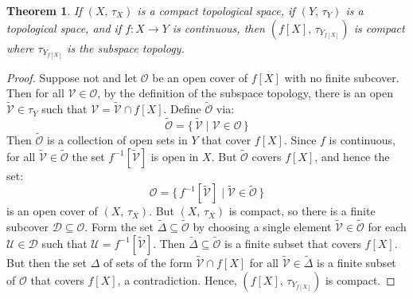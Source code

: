 \documentclass{article}
\theoremstyle{plain}
\newtheorem{theorem}{Theorem}[section]
\theoremstyle{normal}
\begin{document}
        \begin{theorem}
            If $(X,\,\tau_{X})$ is a compact topological space, if
            $(Y,\,\tau_{Y})$ is a topological space, and if
            $f:X\rightarrow{Y}$ is continuous, then
            $(f[X],\,\tau_{Y_{f[X]}})$ is compact where
            $\tau_{Y_{f[X]}}$ is the subspace topology.
        \end{theorem}
        \begin{proof}
            Suppose not and let $\mathcal{O}$ be an open cover of $f[X]$ with
            no finite subcover. Then for all
            $\mathcal{V}\in\mathcal{O}$, by the definition of the subspace
            topology, there is an open $\tilde{\mathcal{V}}\in\tau_{Y}$ such
            that $\mathcal{V}=\tilde{\mathcal{V}}\cap{f}[X]$.
            Define $\tilde{\mathcal{O}}$ via:
            \begin{equation}
                \tilde{\mathcal{O}}
                =\{\,\tilde{\mathcal{V}}\;|\;\mathcal{V}\in\mathcal{O}\,\}
            \end{equation}
            Then $\tilde{\mathcal{O}}$ is a collection of open sets in $Y$ that
            cover $f[X]$. Since $f$ is continuous, for all
            $\tilde{\mathcal{V}}\in\tilde{\mathcal{O}}$ the set
            $f^{-1}[\tilde{\mathcal{V}}]$ is open in $X$. But
            $\tilde{\mathcal{O}}$ covers $f[X]$, and hence the set:
            \begin{equation}
                \mathscr{O}
                =\{\,f^{-1}[\tilde{\mathcal{V}}]\;|\;
                    \tilde{\mathcal{V}}\in\tilde{\mathcal{O}}\,\}
            \end{equation}
            is an open cover of $(X,\,\tau_{X})$. But $(X,\,\tau_{X})$ is
            compact, so there is a finite subcover
            $\mathscr{D}\subseteq\mathscr{O}$. Form the set
            $\tilde{\Delta}\subseteq\tilde{\mathcal{O}}$ by choosing a single
            element $\tilde{\mathcal{V}}\in\tilde{\mathcal{O}}$ for each
            $\mathcal{U}\in\mathscr{D}$ such that
            $\mathcal{U}=f^{-1}[\tilde{\mathcal{V}}]$. Then
            $\tilde{\Delta}\subseteq\tilde{\mathcal{O}}$ is a finite subset that
            covers $f[X]$. But then the set $\Delta$ of sets of the form
            $\tilde{\mathcal{V}}\cap{f}[X]$ for all
            $\tilde{\mathcal{V}}\in\tilde{\Delta}$ is a finite subset of
            $\mathcal{O}$ that covers $f[X]$, a contradiction.
            Hence, $(f[X],\,\tau_{Y_{f[X]}})$ is compact.
        \end{proof}
\end{document}
